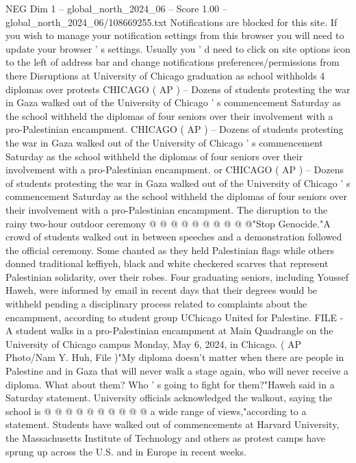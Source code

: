 \begin{textsample}{NEG Dim 1 – global\_north\_2024\_06 – Score 1.00 – global\_north\_2024\_06/108669255.txt}  \label{ex:f1_neg_137}
Notifications are blocked for this site.
If you wish to manage your notification settings from this browser you will need to update your browser ' s settings.
Usually you ' d need to click on site options icon to the left of address bar and change notifications preferences/permissions from there Disruptions at University of Chicago graduation as school withholds 4 diplomas over protests CHICAGO ( AP ) -- Dozens of students protesting the war in Gaza walked out of the University of Chicago ' s commencement Saturday as the school withheld the diplomas of four seniors over their involvement with a pro-Palestinian encampment.
CHICAGO ( AP ) -- Dozens of students protesting the war in Gaza walked out of the University of Chicago ' s commencement Saturday as the school withheld the diplomas of four seniors over their involvement with a pro-Palestinian encampment. or CHICAGO ( AP ) -- Dozens of students protesting the war in Gaza walked out of the University of Chicago ' s commencement Saturday as the school withheld the diplomas of four seniors over their involvement with a pro-Palestinian encampment.
The disruption to the rainy two-hour outdoor ceremony @ @ @ @ @ @ @ @ @ @"Stop Genocide."A crowd of students walked out in between speeches and a demonstration followed the official ceremony.
Some chanted as they held Palestinian flags while others donned traditional keffiyeh, black and white checkered scarves that represent Palestinian solidarity, over their robes.
Four graduating seniors, including Youssef Haweh, were informed by email in recent days that their degrees would be withheld pending a disciplinary process related to complaints about the encampment, according to student group UChicago United for Palestine.
FILE - A student walks in a pro-Palestinian encampment at Main Quadrangle on the University of Chicago campus Monday, May 6, 2024, in Chicago. ( AP Photo/Nam Y.
Huh, File )"My diploma doesn't matter when there are people in Palestine and in Gaza that will never walk a stage again, who will never receive a diploma.
What about them?
Who ' s going to fight for them?"Haweh said in a Saturday statement.
University officials acknowledged the walkout, saying the school is @ @ @ @ @ @ @ @ @ @ a wide range of views,"according to a statement.
Students have walked out of commencements at Harvard University, the Massachusetts Institute of Technology and others as protest camps have sprung up across the U.S. and in Europe in recent weeks.

\end{textsample}
